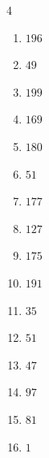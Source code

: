 \begin{multicols}{4}
\begin{enumerate}
  \item $196$


  \item $49$


  \item $199$


  \item $169$


  \item $180$


  \item $51$


  \item $177$


  \item $127$


  \item $175$


  \item $191$


  \item $35$


  \item $51$


  \item $47$


\columnbreak %

  \item $97$


  \item $81$


  \item $1$


\end{enumerate}
\end{multicols}
